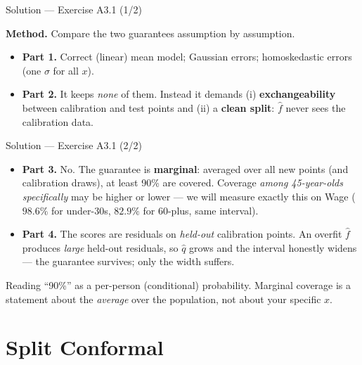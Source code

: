 \documentclass[aspectratio=169,11pt]{beamer}
\begin{document}
\begin{frame}{Solution --- Exercise A3.1 (1/2)}
\begin{solutionbox}
  \textbf{Method.} Compare the two guarantees assumption by assumption.
  \begin{itemize}
    \item \textbf{Part 1.} Correct (linear) mean model; Gaussian errors;
          homoskedastic errors (one $\sigma$ for all $x$).
    \item \textbf{Part 2.} It keeps \emph{none} of them. Instead it demands
          (i) \textbf{exchangeability} between calibration and test points and
          (ii) a \textbf{clean split}: $\hat f$ never sees the calibration data.
  \end{itemize}
\end{solutionbox}
\end{frame}

\begin{frame}{Solution --- Exercise A3.1 (2/2)}
\begin{solutionbox}
  \begin{itemize}
    \item \textbf{Part 3.} No. The guarantee is \textbf{marginal}: averaged over all
          new points (and calibration draws), at least 90\% are covered. Coverage
          \emph{among 45-year-olds specifically} may be higher or lower --- we will
          measure exactly this on Wage ($98.6\%$ for under-30s, $82.9\%$ for
          60-plus, same interval).
    \item \textbf{Part 4.} The scores are residuals on \emph{held-out} calibration
          points. An overfit $\hat f$ produces \emph{large} held-out residuals, so
          $\hat q$ grows and the interval honestly widens --- the guarantee survives;
          only the width suffers.
  \end{itemize}
\end{solutionbox}
\begin{mistake}
  Reading ``90\%'' as a per-person (conditional) probability. Marginal coverage is a
  statement about the \emph{average} over the population, not about your specific $x$.
\end{mistake}
\end{frame}

\section{Split Conformal}
\end{document}
